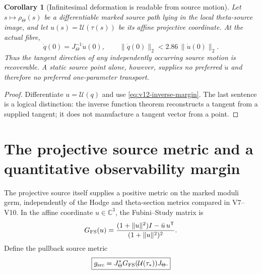 \documentclass[11pt]{article}
\newtheorem{corollary}[corollary]{Corollary}
\theoremstyle{definition}
\theoremstyle{remark}
\begin{document}
\begin{corollary}[Infinitesimal deformation is readable from source motion]
\label{cor:v12-tangent}
Let \(s\mapsto\rho_\Theta(s)\) be a differentiable marked source path lying in
the local theta-source image, and let \(u(s)=\mathcal U(\tau(s))\) be its
affine projective coordinate.  At the actual fibre,
\begin{equation}
 \boxed{
 \dot q(0)=J_\Theta^{-1}\dot u(0),
 \qquad
 \|\dot q(0)\|_2<2.86\,\|\dot u(0)\|_2.}
 \label{eq:v12-tangent-reconstruction}
\end{equation}
Thus the tangent direction of any independently occurring source motion is
recoverable.  A static source point alone, however, supplies no preferred
\(\dot u\) and therefore no preferred one-parameter transport.
\end{corollary}
\begin{proof}
Differentiate \(u=\mathcal U(q)\) and use
\cref{eq:v12-inverse-margin}.  The last sentence is a logical distinction:
the inverse function theorem reconstructs a tangent from a supplied tangent;
it does not manufacture a tangent vector from a point.
\end{proof}

\section{The projective source metric and a quantitative observability margin}
\label{sec:v12-source-metric}
The projective source itself supplies a positive metric on the marked moduli
germ, independently of the Hodge and theta-section metrics compared in
V7--V10.  In the affine coordinate \(u\in\mathbb C^3\), the Fubini--Study
matrix is
\begin{equation}
 G_{\rm FS}(u)
 =\frac{(1+\|u\|^2)I-\bar u\,u^{\mathsf T}}
        {(1+\|u\|^2)^2}.
 \label{eq:v12-fs}
\end{equation}
Define the pullback source metric
\begin{equation}
 \boxed{g_{\rm src}=J_\Theta^*G_{\rm FS}(\mathcal U(\tau_*))J_\Theta.}
 \label{eq:v12-source-metric}
\end{equation}
\end{document}
